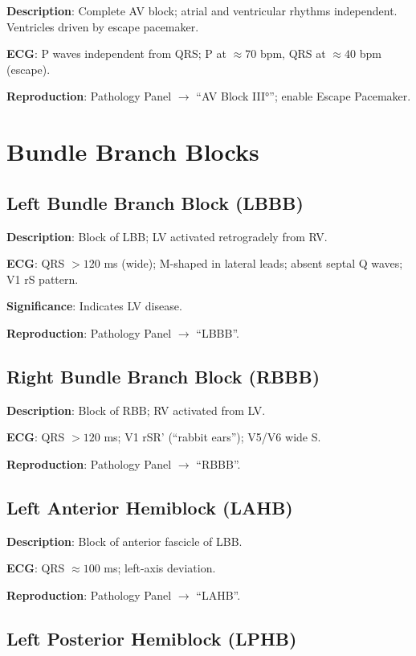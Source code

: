 \documentclass[12pt]{book}
\begin{document}
\textbf{Description}: Complete AV block; atrial and ventricular rhythms independent. Ventricles driven by escape pacemaker.

\textbf{ECG}: P waves independent from QRS; P at $\approx 70$ bpm, QRS at $\approx 40$ bpm (escape).

\textbf{Reproduction}: Pathology Panel $\to$ ``AV Block III°''; enable Escape Pacemaker.

\section{Bundle Branch Blocks}

\subsection{Left Bundle Branch Block (LBBB)}

\textbf{Description}: Block of LBB; LV activated retrogradely from RV.

\textbf{ECG}: QRS $>120$ ms (wide); M-shaped in lateral leads; absent septal Q waves; V1 rS pattern.

\textbf{Significance}: Indicates LV disease.

\textbf{Reproduction}: Pathology Panel $\to$ ``LBBB''.

\subsection{Right Bundle Branch Block (RBBB)}

\textbf{Description}: Block of RBB; RV activated from LV.

\textbf{ECG}: QRS $>120$ ms; V1 rSR' (``rabbit ears''); V5/V6 wide S.

\textbf{Reproduction}: Pathology Panel $\to$ ``RBBB''.

\subsection{Left Anterior Hemiblock (LAHB)}

\textbf{Description}: Block of anterior fascicle of LBB.

\textbf{ECG}: QRS $\approx 100$ ms; left-axis deviation.

\textbf{Reproduction}: Pathology Panel $\to$ ``LAHB''.

\subsection{Left Posterior Hemiblock (LPHB)}
\end{document}
